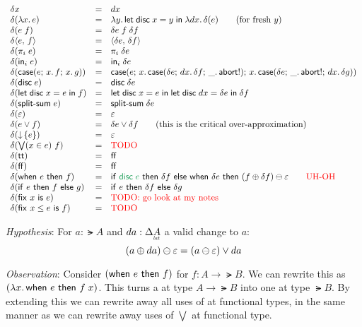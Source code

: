 \documentclass{article}
\begin{document}
\[
\begin{array}{lcll}
  \delta x &=& dx\\
  \delta(\fn\bind{x} e) &=& \fn\bind{y} \letdisc{x}{y} {\fn\bind{dx} \delta(e)}
  \qquad\text{(for fresh $y$)}\\
  \delta(e\;f) &=& \delta e \; f \; \delta f\\
  \delta \pair{e}{f} &=& \pair{\delta{e}}{\delta{f}}\\
  \delta(\pi_i\; e) &=& \pi_i\; \delta{e}\\
  \delta(\inj{i}{e}) &=& \inj{i}{\delta{e}}\\
  \delta(\case{e}{x}{f}{x}{g})
  &=& \case{e}
        {x}{\case{\delta e}{dx}{\delta f}{\_}{\ms{abort!}}}
        {x}{\case{\delta e}{\_}{\ms{abort!}}{dx}{\delta g}}\\
  \delta(\disc e) &=& \disc{\delta e}\\
  \delta(\letdisc{x}{e}{f}) &=&
  \letdisc{x}{e}{
    \letdisc{dx}{\delta e}{\delta f}}\\
  \delta(\splitsum{e}) &=&
  \splitsum{\delta e}\\
  \delta(\unit) &=& \unit\\
  \delta(e \vee f) &=& \delta e \vee \delta f
  \qquad \text{(this is the critical over-approximation)}\\
  \delta(\downintro{e}) &=& \unit\\
  \delta(\downelim{x}{e}{f}) &=& \text{\TODO}\\
  \delta(\ett) &=& \eff\\
  \delta(\eff) &=& \eff\\
  \delta(\when{e}{f})
  &=& \ifthen{\color{ForestGreen} \disc{e}}{\delta f}{
    \when{\delta e}{(f \oplus \delta f) \ominus \unit}}
  \qquad \text{\color{red} UH-OH}\\
  \delta(\ifthen{e}{f}{g}) &=& \ifthen{e}{\delta f}{\delta g}\\
  \delta(\fix{x}{e}) &=& \text{\todo{TODO: go look at my notes}}\\
  \delta(\fixle{x}{e}{f}) &=& \text{\TODO}
\end{array}
\]

\emph{Hypothesis}: For $a : \lat{A}$ and $da : \GD\lat{A}$ a valid change to
$a$:
\begin{equation*}
  (a \oplus da) \ominus \varepsilon = (a \ominus \varepsilon)
  \vee da
\end{equation*}

\emph{Observation}: Consider $(\mathsf{when}~{e}~\mathsf{then}~{f})$ for $f : A \to \lat{B}$. We can
rewrite this as $(\lambda x.\, \mathsf{when}~{e}~\mathsf{then}~{f\; x})$. This turns a  at type
$A \to \lat{B}$ into one at type $\lat{B}$. By extending this we can rewrite
away all uses of  at functional types, in the same manner as we can
rewrite away uses of $\bigvee$ at functional type.

\end{document}
